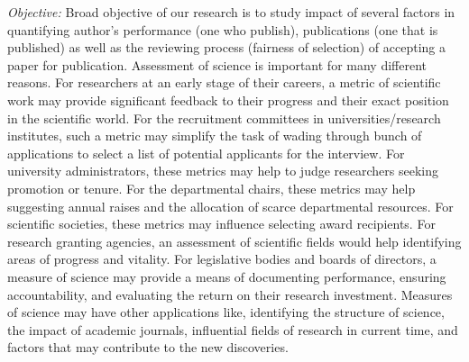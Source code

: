 {\em Objective:} Broad objective of our research is to study impact of several factors in quantifying author’s performance (one who publish), publications (one that is published) as well as the reviewing process (fairness of selection) of accepting a paper for publication. Assessment of science is important for many different reasons. For researchers at an early stage of their careers, a metric of scientific work may provide significant feedback to their progress and their exact position in the scientific world. For the recruitment committees in universities/research institutes, such a metric may simplify the task of wading through bunch of applications to select a list of potential applicants for the interview. For university administrators, these metrics may help to judge researchers seeking promotion or tenure. For the departmental chairs, these metrics may help suggesting annual raises and the allocation of scarce departmental resources. For scientific societies, these metrics may influence selecting award recipients. For research granting agencies, an assessment of scientific fields would help identifying areas of progress and vitality. For legislative bodies and boards of directors, a measure of science may provide a means of documenting performance, ensuring accountability, and evaluating the return on their research investment. Measures of science may have other applications like, identifying the structure of science, the impact of academic journals, influential fields of research in current time, and factors that may contribute to the new discoveries. 


 

